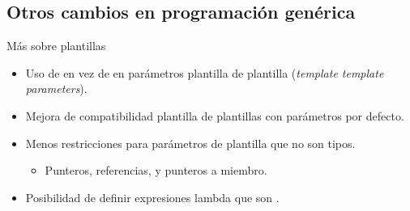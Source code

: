 \subsection{Otros cambios en programación genérica}

\begin{frame}[t]{Más sobre plantillas}
\begin{itemize}
  \item Uso de  en vez de  en parámetros
        plantilla de plantilla (\emph{template template parameters}).
  \item Mejora de compatibilidad plantilla de plantillas con parámetros por defecto.
  \item Menos restricciones para parámetros de plantilla que no son tipos.
    \begin{itemize}
      \item Punteros, referencias, y punteros a miembro.
    \end{itemize}
  \item Posibilidad de definir expresiones lambda que son .
\end{itemize}
\end{frame}
